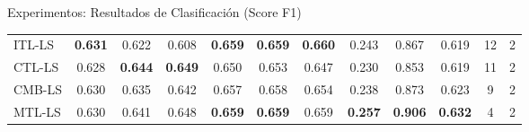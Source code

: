 \documentclass[aspectratio=43,spanish]{beamer}
\newcommand{\fmaxn}[1]{\textbf{#1}}
\newcommand{\fmod}[1]{\textsf{#1}}
\begin{document}
\begin{frame}{Experimentos: Resultados de Clasificación (Score F1)}
\begin{table}[t]
{\begin{tabular}{ l*{8}{S[table-format=1.3]} c c c}
              \midrule
              \fmod{ITL-LS}    &          \fmaxn{0.631} &           0.622 &                  0.608 &         \fmaxn{0.659} &          \fmaxn{0.659} &                 \fmaxn{0.660} &    0.243 &   0.867 & 0.619 &     12 & 2 \\
              \fmod{CTL-LS}    &          0.628 &           \fmaxn{0.644} &                  \fmaxn{0.649} &         0.650 &          0.653 &                 0.647 &    0.230 &   0.853 & 0.619 &     11 & 2 \\
              \fmod{CMB-LS} &          0.630 &           0.635 &                  0.642 &         0.657 &          0.658 &                 0.654 &    0.238 &   0.873 & 0.623 &      9 & 2 \\
              \fmod{MTL-LS}    &          0.630 &           0.641 &                  0.648 &         \fmaxn{0.659} &          \fmaxn{0.659} &                 0.659 &    \fmaxn{0.257} &   \fmaxn{0.906} & \fmaxn{0.632} &      4 & 2 \\
              \bottomrule
            \end{tabular}}
        \end{table}
  
  \end{frame}
  
\end{document}
